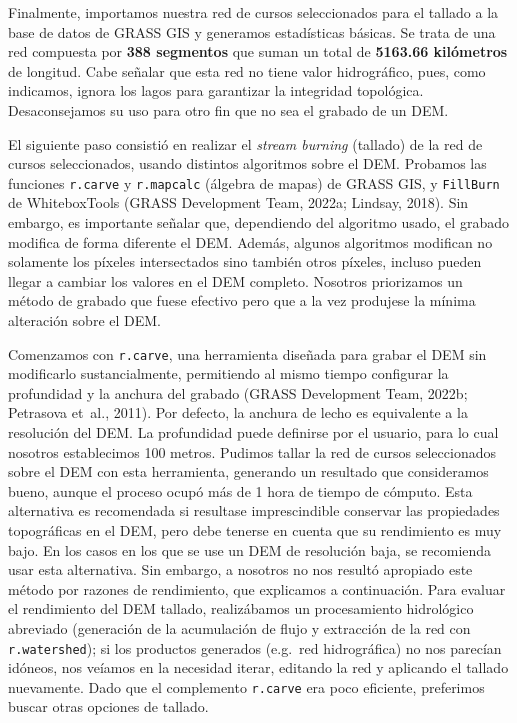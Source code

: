 \documentclass[spanish]{article}
\begin{document}
Finalmente, importamos nuestra red de cursos seleccionados para el
tallado a la base de datos de GRASS GIS y generamos estadísticas
básicas. Se trata de una red compuesta por \textbf{388 segmentos} que
suman un total de \textbf{5163.66 kilómetros} de longitud. Cabe señalar
que esta red no tiene valor hidrográfico, pues, como indicamos, ignora
los lagos para garantizar la integridad topológica. Desaconsejamos su
uso para otro fin que no sea el grabado de un DEM.

El siguiente paso consistió en realizar el \emph{stream burning}
(tallado) de la red de cursos seleccionados, usando distintos algoritmos
sobre el DEM. Probamos las funciones \texttt{r.carve} y
\texttt{r.mapcalc} (álgebra de mapas) de GRASS GIS, y \texttt{FillBurn}
de WhiteboxTools (GRASS Development Team, 2022a; Lindsay, 2018). Sin
embargo, es importante señalar que, dependiendo del algoritmo usado, el
grabado modifica de forma diferente el DEM. Además, algunos algoritmos
modifican no solamente los píxeles intersectados sino también otros
píxeles, incluso pueden llegar a cambiar los valores en el DEM completo.
Nosotros priorizamos un método de grabado que fuese efectivo pero que a
la vez produjese la mínima alteración sobre el DEM.

Comenzamos con \texttt{r.carve}, una herramienta diseñada para grabar el
DEM sin modificarlo sustancialmente, permitiendo al mismo tiempo
configurar la profundidad y la anchura del grabado (GRASS Development
Team, 2022b; Petrasova et~al., 2011). Por defecto, la anchura de lecho
es equivalente a la resolución del DEM. La profundidad puede definirse
por el usuario, para lo cual nosotros establecimos 100 metros. Pudimos
tallar la red de cursos seleccionados sobre el DEM con esta herramienta,
generando un resultado que consideramos bueno, aunque el proceso ocupó
más de 1 hora de tiempo de cómputo. Esta alternativa es recomendada si
resultase imprescindible conservar las propiedades topográficas en el
DEM, pero debe tenerse en cuenta que su rendimiento es muy bajo. En los
casos en los que se use un DEM de resolución baja, se recomienda usar
esta alternativa. Sin embargo, a nosotros no nos resultó apropiado este
método por razones de rendimiento, que explicamos a continuación. Para
evaluar el rendimiento del DEM tallado, realizábamos un procesamiento
hidrológico abreviado (generación de la acumulación de flujo y
extracción de la red con \texttt{r.watershed}); si los productos
generados (e.g.~red hidrográfica) no nos parecían idóneos, nos veíamos
en la necesidad iterar, editando la red y aplicando el tallado
nuevamente. Dado que el complemento \texttt{r.carve} era poco eficiente,
preferimos buscar otras opciones de tallado.
\end{document}
